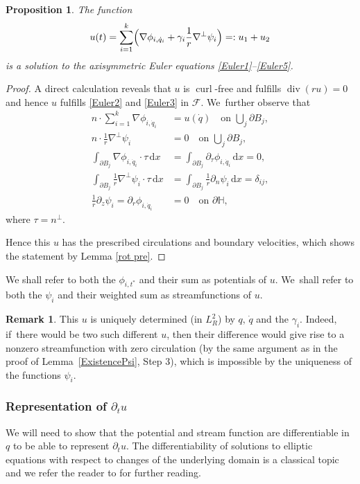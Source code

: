 \documentclass[JEP,XML,SOM,Unicode,published]{cedram}
\let\ts\textstyle
\newtheorem{proposition}[theorem]{Proposition}
\theoremstyle{definition}
\newtheorem{remark}[theorem]{Remark}
\renewcommand{\div}{\operatorname{div}}
\DeclareMathOperator{\curl}{curl}
\newcommand\eq{=}
\newcommand\dd{\,\mathrm{d}}
\newcommand\dx{\dd x}
\let\de\partial
\begin{document}
\begin{proposition}\label{prop rep u}
The function
\begin{align}\label{u1u2}
u(t)\eq\sum_{i=1}^k\Bigl(\nabla\phi_{i,\dot{q}_i}+\gamma_i\frac{1}{r}\nabla^\perp\psi_i\Bigr)=:u_1+u_2
\end{align}
is a solution to the axisymmetric Euler equations \eqref{Euler1}--\eqref{Euler5}.
\end{proposition}
\begin{proof}
A direct calculation reveals that $u$ is $\curl$-free and fulfills $\div(ru)=0$ and hence $u$ fulfills \eqref{Euler2} and \eqref{Euler3} in $\mathcal{F}$. We~further observe that
\begin{align*}
n\cdot\sum_{i=1}^k\nabla\phi_{i,\dot{q}_i}&\eq u(\dot{q}) \quad\text{on $\ts\bigcup_j\de B_j$},\\
n\cdot\frac{1}{r}\nabla^\perp\psi_i&\eq 0 \quad\text{on $\ts\bigcup_j\de B_j$},\\
\int_{\de B_j}\nabla\phi_{i,\dot{q}_i}\cdot\tau\dx&\eq \int_{\de B_j}\de_\tau\phi_{i,\dot{q}_i}\dx\eq0,\\
\int_{\de B_j}\frac{1}{r}\nabla^\perp\psi_{i}\cdot\tau\dx&\eq \int_{\de B_j}\frac{1}{r}\de_n\psi_{i}\dx\eq\delta_{ij},\\
\frac{1}{r}\de_z\psi_i\eq \de_r\phi_{i,\dot{q}_i}&\eq 0\quad\text{on $\de \mathbb{H}$},
\end{align*}
where $\tau=n^\perp$.

Hence this $u$ has the prescribed circulations and boundary velocities, which shows the statement by Lemma \ref{rot pre}.
\end{proof}

We shall refer to both the $\phi_{i,t^*}$ and their sum as potentials of $u$. We~shall refer to both the $\psi_i$ and their weighted sum as streamfunctions of $u$.

\begin{remark}\label{uunique}
This $u$ is uniquely determined (in $L_R^2$) by $q,\,\dot{q}$ and the $\gamma_i$. Indeed, if~there would be two such different $u$, then their difference would give rise to a nonzero streamfunction with zero circulation (by the same argument as in the proof of Lemma~\ref{ExistencePsi}, Step 3), which is impossible by the uniqueness of the functions $\psi_i$.
\end{remark}

\subsubsection{Representation of $\de_t u$}
We will need to show that the potential and stream function are differentiable in $q$ to be able to represent $\de_tu$. The differentiability of solutions to elliptic equations with respect to changes of the underlying domain is a classical topic and we refer the reader to \cite{sokolowski1992introduction} for further reading.
\end{document}
